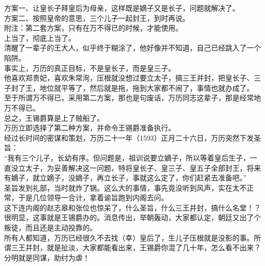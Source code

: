 \begin{multicols}{\theparacolNo}
方案一、让皇长子拜皇后为母亲，这样既是嫡子又是长子，问题就解决了。\\

方案二、按照皇帝的意思，三个儿子一起封王，到时再说。\\

附注：第二套方案，只有在万不得已的时候，才能使用。\\

上当了，彻底上当了。\\

清醒了一辈子的王大人，似乎终于糊涂了，他好像并不知道，自己已经跳入了一个陷阱。\\

事实上，万历的真正目标，不是皇长子，而是皇三子。\\

他喜欢郑贵妃，喜欢朱常洵，压根就没想过要立太子，搞三王并封，把皇长子、三子封了王，地位就平等了，然后就是拖，拖到大家都不闹了，事情也就办成了。\\

至于所谓万不得已，采用第二方案，那也是句废话，万历同志这辈子，那是经常地万不得已。\\

总之，王锡爵算是上了贼船了。\\

万历立即选择了第二种方案，并命令王锡爵准备执行。\\

经过长时间的密谋和策划，万历二十一年（1593）正月二十六日，万历突然下发圣旨：\\

“我有三个儿子，长幼有序。但问题是，祖训说要立嫡子，所以等着皇后生子，一直没立太子，为妥善解决这一问题，特将皇长子、皇三子、皇五子全部封王，将来有嫡子，就立嫡子，没嫡子，再立长子，事就这么定了，你们赶紧去准备吧。”\\

圣旨发到礼部，当时就炸了锅。这么大的事情，事先竟没听到风声，实在太不正常，于是几位领导一合计，拿着谕旨跑到内阁去问。\\

这下连内阁的赵志皋和张位也惊呆了，什么圣旨，什么三王并封，搞什么名堂！？\\

很明显，这事就是王锡爵办的。消息传出，举朝轰动，大家都认定，朝廷又出了个叛徒，而且还是主动投靠的。\\

所有人都知道，万历已经很久不去找（幸）皇后了，生儿子压根就是没影的事。所谓三王并封，就是扯淡，大家都能看出来，王锡爵你混了几十年，怎么看不出来？分明就是同谋，助纣为虐！\\


\end{multicols}
